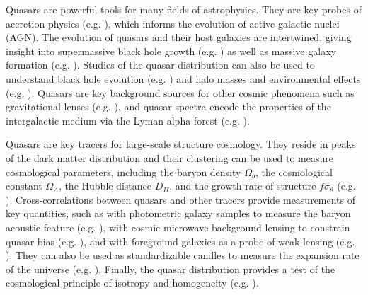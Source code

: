 Quasars are powerful tools for many fields of astrophysics. 
They are key probes of accretion physics (e.g. \citealt{SunyaevZeldovich1970, yu_quasar_2020}), which informs the evolution of active galactic nuclei (AGN). 
The evolution of quasars and their host galaxies are intertwined, giving insight into supermassive black hole growth (e.g. \citealt{hopkins_unified_2006}) as well as massive galaxy formation (e.g. \citealt{kormendy_coevolution_2013}).
Studies of the quasar distribution can also be used to understand black hole evolution (e.g. \citealt{powell_clustering_2020}) and halo masses and environmental effects (e.g. \citealt{dipompeo_characteristic_2017}).
Quasars are  key background sources for other cosmic phenomena such as gravitational lenses (e.g. \citealt{claeskens_gravitational_2002}), and quasar spectra encode the properties of the intergalactic medium via the Lyman alpha forest (e.g. \citealt{rauch_lyman_1998}). 

Quasars are key tracers for large-scale structure cosmology.
They reside in peaks of the dark matter distribution and their clustering can be used to measure cosmological parameters, including the baryon density $\Omega_b$, the cosmological constant $\Omega_\Lambda$, the Hubble distance $D_H$, and the growth rate of structure $f\sigma_8$ (e.g. \citealt{yahata_large-scale_2005, hou_completed_2020}).
Cross-correlations between quasars and other tracers provide measurements of key quantities, such as with photometric galaxy samples to measure the baryon acoustic feature (e.g. \citealt{}), with cosmic microwave background lensing to constrain quasar bias (e.g. \citealt{sherwin_atacama_2012}), and with foreground galaxies as a probe of weak lensing (e.g. \citealt{menard_cosmological_2002, scranton_detection_2005, zarrouk_baryon_2021}).
They can also be used as standardizable candles to measure the expansion rate of the universe (e.g. \citealt{setti_hubble_1973, risaliti_hubble_2015, lusso_quasars_2020}).
Finally, the quasar distribution provides a test of the cosmological principle of isotropy and homogeneity (e.g. \citealt{secrest_test_2021, dam_testing_2022}).

